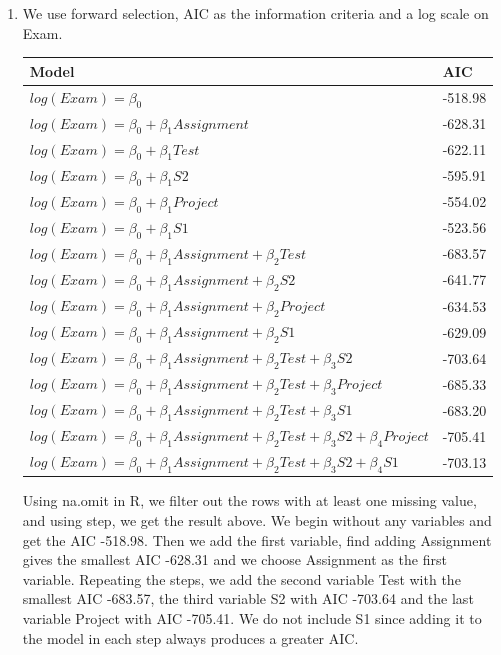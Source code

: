 \documentclass[10pt]{article}
\begin{document}
\begin{enumerate}[1)]
\item
We use forward selection, AIC as the information criteria and a log scale on {\ttfamily Exam}.
\begin{table}[H]
\centering
\scriptsize
\begin{tabular}{l|l}
Model & AIC \\ \hline
$log(Exam)=\beta_0$ & -518.98 \\ \hline
$log(Exam)=\beta_0+\beta_1 Assignment$ & -628.31 \\
$log(Exam)=\beta_0+\beta_1 Test$ & -622.11 \\
$log(Exam)=\beta_0+\beta_1 S2$ & -595.91 \\
$log(Exam)=\beta_0+\beta_1 Project$ & -554.02 \\
$log(Exam)=\beta_0+\beta_1 S1$ & -523.56 \\ \hline
$log(Exam)=\beta_0+\beta_1 Assignment+\beta_2 Test$ & -683.57 \\
$log(Exam)=\beta_0+\beta_1 Assignment+\beta_2 S2$ & -641.77 \\
$log(Exam)=\beta_0+\beta_1 Assignment+\beta_2 Project$ & -634.53 \\
$log(Exam)=\beta_0+\beta_1 Assignment+\beta_2 S1$ & -629.09 \\ \hline
$log(Exam)=\beta_0+\beta_1 Assignment+\beta_2 Test+\beta_3 S2$ & -703.64 \\
$log(Exam)=\beta_0+\beta_1 Assignment+\beta_2 Test+\beta_3 Project$ & -685.33 \\
$log(Exam)=\beta_0+\beta_1 Assignment+\beta_2 Test+\beta_3 S1$ & -683.20 \\ \hline
$log(Exam)=\beta_0+\beta_1 Assignment+\beta_2 Test+\beta_3 S2+\beta_4 Project$ & -705.41 \\
$log(Exam)=\beta_0+\beta_1 Assignment+\beta_2 Test+\beta_3 S2+\beta_4 S1$ & -703.13 \\
\end{tabular}
\end{table}
Using {\ttfamily na.omit} in R, we filter out the rows with at least one missing value, and using {\ttfamily step}, we get the result above. We begin without any variables and get the AIC -518.98. Then we add the first variable, find adding {\ttfamily Assignment} gives the smallest AIC -628.31 and we choose {\ttfamily Assignment} as the first variable. Repeating the steps, we add the second variable {\ttfamily Test} with the smallest AIC -683.57, the third variable {\ttfamily S2} with AIC -703.64 and the last variable {\ttfamily Project} with AIC -705.41. We do not include {\ttfamily S1} since adding it to the model in each step always produces a greater AIC.\\

\end{enumerate}
\end{document}
